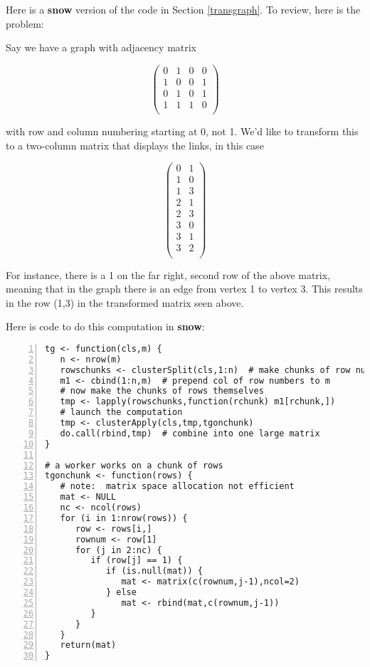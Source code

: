 Here is a {\bf snow} version of the code in Section \ref{transgraph}.
To review, here is the problem:

Say we have a graph with adjacency matrix

\begin{equation}
\left (
\begin{array}{rrrr}
0 & 1 & 0 & 0 \\
1 & 0 & 0 & 1 \\
0 & 1 & 0 & 1 \\
1 & 1 & 1 & 0 \\
\end{array}
\right )
\end{equation}

with row and column numbering starting at 0, not 1.  We'd like to
transform this to a two-column matrix that displays the links, in this
case

\begin{equation}
\left (
\begin{array}{rr}
0 & 1 \\
1 & 0 \\
1 & 3 \\
2 & 1 \\
2 & 3 \\
3 & 0 \\
3 & 1 \\
3 & 2 \\
\end{array}
\right )
\end{equation}

For instance, there is a 1 on the far right, second row of the above
matrix, meaning that in the graph there is an edge from vertex 1 to
vertex 3.  This results in the row (1,3) in the transformed matrix seen
above.

Here is code to do this computation in {\bf snow}:

\begin{lstlisting}[numbers=left]
tg <- function(cls,m) {
   n <- nrow(m)
   rowschunks <- clusterSplit(cls,1:n)  # make chunks of row numbers
   m1 <- cbind(1:n,m)  # prepend col of row numbers to m
   # now make the chunks of rows themselves
   tmp <- lapply(rowschunks,function(rchunk) m1[rchunk,])
   # launch the computation
   tmp <- clusterApply(cls,tmp,tgonchunk)
   do.call(rbind,tmp)  # combine into one large matrix
}

# a worker works on a chunk of rows
tgonchunk <- function(rows) {
   # note:  matrix space allocation not efficient
   mat <- NULL
   nc <- ncol(rows)
   for (i in 1:nrow(rows)) {
      row <- rows[i,]
      rownum <- row[1]
      for (j in 2:nc) {
         if (row[j] == 1) {
            if (is.null(mat)) {
               mat <- matrix(c(rownum,j-1),ncol=2)
            } else
               mat <- rbind(mat,c(rownum,j-1))
         }
      }
   }
   return(mat)
}
\end{lstlisting}

